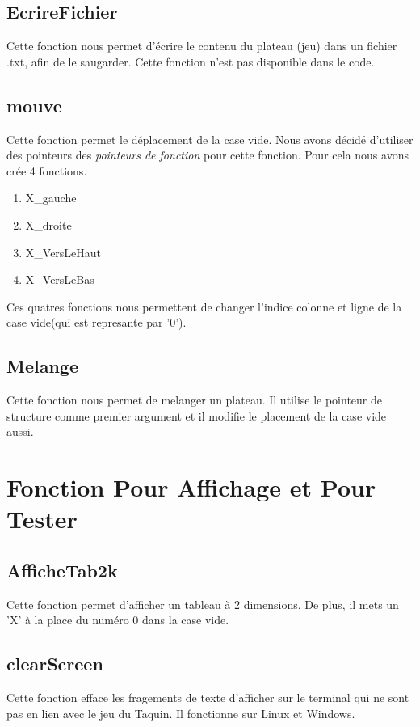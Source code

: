 \documentclass{article}
\begin{document}
\subsection{EcrireFichier}
Cette fonction nous permet d'écrire le contenu du plateau (jeu) dans un fichier .txt, afin de le saugarder.
Cette fonction n'est pas disponible dans le code.

\subsection{mouve}
Cette fonction permet le déplacement de la case vide. Nous avons décidé d'utiliser des pointeurs des \textit{pointeurs de fonction} pour cette fonction. Pour cela nous avons crée 4 fonctions.	

\begin{enumerate}
	\item X\_gauche 			
	\item X\_droite 			
	\item X\_VersLeHaut		
	\item X\_VersLeBas		
\end{enumerate}

Ces quatres fonctions nous permettent de changer l'indice colonne et ligne de la case vide(qui est represante par '0'). 
	

\subsection{Melange}
Cette fonction nous permet de melanger un plateau. Il utilise le pointeur de structure comme premier argument et il modifie le placement de la case vide aussi.

\newpage

\section{Fonction Pour Affichage et Pour Tester}

\subsection{AfficheTab2k}
Cette fonction permet d'afficher un tableau à 2 dimensions. De plus, il mets un 'X' à la place du numéro 0 dans la case vide.

\subsection{clearScreen}
Cette fonction efface les fragements de texte d'afficher sur le terminal qui ne sont pas en lien avec le jeu du Taquin. Il fonctionne sur Linux et Windows.
\end{document}
